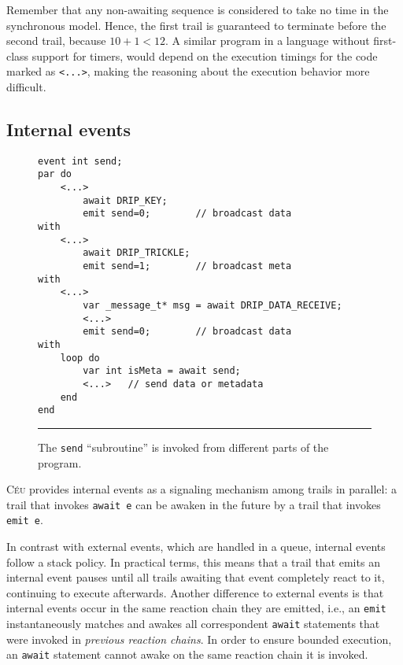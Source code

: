 \documentclass[10pt]{sensys-proc}
\newcommand{\CEU}{\textsc{C\'{e}u}\xspace}
\newcommand{\code}[1] {{\small{\texttt{#1}}}}
\begin{document}
Remember that any non-awaiting sequence is considered to take no time in the 
synchronous model.
Hence, the first trail is guaranteed to terminate before the second trail, 
because $10+1 < 12$.
A similar program in a language without first-class support for timers, would 
depend on the execution timings for the code marked as \code{<...>}, making the 
reasoning about the execution behavior more difficult.


\subsection{Internal events}
\label{sec.ceu.ints}

\begin{figure}[t]
{\small
\begin{verbatim}
event int send;
par do
    <...>
        await DRIP_KEY;
        emit send=0;        // broadcast data
with
    <...>
        await DRIP_TRICKLE;
        emit send=1;        // broadcast meta
with
    <...>
        var _message_t* msg = await DRIP_DATA_RECEIVE;
        <...>
        emit send=0;        // broadcast data
with
    loop do
        var int isMeta = await send;
        <...>   // send data or metadata
    end
end
\end{verbatim}
}
\rule{8.5cm}{0.37pt}
\caption{ The \code{send} ``subroutine'' is invoked from different parts of the 
program.
\label{lst.func}
}
\end{figure}


\CEU provides internal events as a signaling mechanism among trails in 
parallel:
a trail that invokes \code{await~e} can be awaken in the future by a trail that 
invokes \code{emit~e}.

In contrast with external events, which are handled in a queue, internal events 
follow a stack policy.
In practical terms, this means that a trail that emits an internal event pauses 
until all trails awaiting that event completely react to it, continuing to 
execute afterwards.
%
Another difference to external events is that internal events occur in the same 
reaction chain they are emitted, i.e., an \code{emit} instantaneously matches 
and awakes all correspondent \code{await} statements that were invoked in 
\emph{previous reaction chains}.
In order to ensure bounded execution, an \code{await} statement cannot awake on 
the same reaction chain it is invoked.
\end{document}

